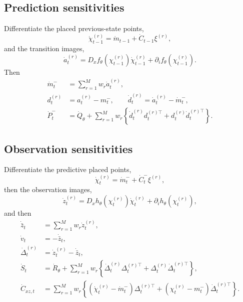 \documentclass[11pt]{article}
\numberwithin{equation}{section}
\begin{document}
\subsection{Prediction sensitivities}

Differentiate the placed previous-state points,
\begin{equation}
  \dot\chi_{t-1}^{(r)} = \dot m_{t-1}+\dot C_{t-1}\xi^{(r)},
  \label{eq:dot-pred-place}
\end{equation}
and the transition images,
\begin{equation}
  \dot a_t^{(r)} = D_xf_\theta(\chi_{t-1}^{(r)})\dot\chi_{t-1}^{(r)} + \partial_i f_\theta(\chi_{t-1}^{(r)}).
  \label{eq:dot-transition}
\end{equation}
Then
\begin{align}
  \dot m_t^- &= \sum_{r=1}^M w_r\dot a_t^{(r)},
  \label{eq:dot-pred-mean}\\
  d_t^{(r)} &= a_t^{(r)}-m_t^-,
  \qquad
  \dot d_t^{(r)} = \dot a_t^{(r)}-\dot m_t^-,
  \label{eq:pred-centered}\\
  \dot P_t^- &= \dot Q_\theta + \sum_{r=1}^M w_r\left\{
  \dot d_t^{(r)}d_t^{(r)\top} + d_t^{(r)}\dot d_t^{(r)\top}
  \right\}.
  \label{eq:dot-pred-cov}
\end{align}

\subsection{Observation sensitivities}

Differentiate the predictive placed points,
\begin{equation}
  \dot\chi_t^{(r)} = \dot m_t^- + \dot C_t^-\xi^{(r)},
  \label{eq:dot-obs-place}
\end{equation}
then the observation images,
\begin{equation}
  \dot z_t^{(r)} = D_xh_\theta(\chi_t^{(r)})\dot\chi_t^{(r)} + \partial_i h_\theta(\chi_t^{(r)}),
  \label{eq:dot-obs-value}
\end{equation}
and then
\begin{align}
  \dot{\bar z}_t &= \sum_{r=1}^M w_r\dot z_t^{(r)},
  \label{eq:dot-zbar}\\
  \dot v_t &= -\dot{\bar z}_t,
  \label{eq:dot-v}\\
  \dot\Delta_t^{(r)} &= \dot z_t^{(r)}-\dot{\bar z}_t,
  \label{eq:dot-Delta}\\
  \dot S_t &= \dot R_\theta + \sum_{r=1}^M w_r\left\{
  \dot\Delta_t^{(r)}\Delta_t^{(r)\top} + \Delta_t^{(r)}\dot\Delta_t^{(r)\top}
  \right\},
  \label{eq:dot-S}\\
  \dot C_{xz,t} &= \sum_{r=1}^M w_r\left\{
  (\dot\chi_t^{(r)}-\dot m_t^-)\Delta_t^{(r)\top} +
  (\chi_t^{(r)}-m_t^-)\dot\Delta_t^{(r)\top}
  \right\}.
  \label{eq:dot-Cxz}
\end{align}
\end{document}

